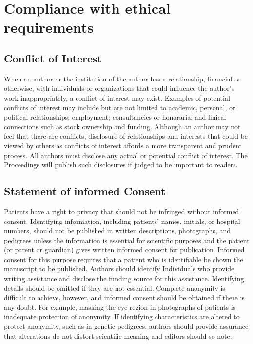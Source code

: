 \documentclass[nouppercase]{cmbec}
\begin{document}
\section{Compliance with ethical requirements}

\subsection{Conflict of Interest}
When an author or the institution of the author has a relationship, financial or otherwise, with individuals or organizations that could influence the author’s work inappropriately, a conflict of interest may exist. Examples of potential conflicts of interest may include but are not limited to academic, personal, or political relationships; employment; consultancies or honoraria; and finical connections such as stock ownership and funding. Although an author may not feel that there are conflicts, disclosure of relationships and interests that could be viewed by others as conflicts of interest affords a more transparent and prudent process. All authors must disclose any actual or potential conflict of interest. The Proceedings will publish such disclosures if judged to be important to readers.

\subsection{Statement of informed Consent}
Patients have a right to privacy that should not be infringed without informed consent. Identifying information, including patients' names, initials, or hospital numbers, should not be published in written descriptions, photographs, and pedigrees unless the information is essential for scientific purposes and the patient (or parent or guardian) gives written informed consent for publication. Informed consent for this purpose requires that a patient who is identifiable be shown the manuscript to be published. Authors should identify Individuals who provide writing assistance and disclose the funding source for this assistance. 
Identifying details should be omitted if they are not essential. Complete anonymity is difficult to achieve, however, and informed consent should be obtained if there is any doubt. For example, masking the eye region in photographs of patients is inadequate protection of anonymity. If identifying characteristics are altered to protect anonymity, such as in genetic pedigrees, authors should provide assurance that alterations do not distort scientific meaning and editors should so note.
\end{document}
